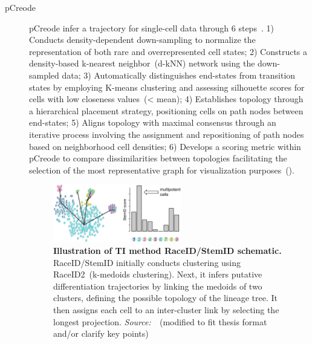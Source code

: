 \begin{description}
  \item[pCreode]

  pCreode infer a trajectory for single-cell data through 6 steps~\citep{herring2018pCreode}. 1) Conducts density-dependent down-sampling to normalize the representation of both rare and overrepresented cell states; 2) Constructs a density-based k-nearest neighbor~(d-kNN) network using the down-sampled data; 3) Automatically distinguishes end-states from transition states by employing K-means clustering and assessing silhouette scores for cells with low closeness values~(< mean); 4) Establishes topology through a hierarchical placement strategy, positioning cells on path nodes between end-states; 5) Aligns topology with maximal consensus through an iterative process involving the assignment and repositioning of path nodes based on neighborhood cell densities; 6) Develops a scoring metric within pCreode to compare dissimilarities between topologies facilitating the selection of the most representative graph for visualization purposes~().

  \begin{figure}[h!]
  	\centering
  	\includegraphics[width=0.55\textwidth]{TI_Alg_StemID/fig}
  	\vspace{0.1cm}
  	\caption[Illustration of TI method RaceID/StemID schematic.]{\textbf{Illustration of TI method RaceID/StemID schematic.}
  	RaceID/StemID initially conducts clustering using RaceID2~(k-medoids clustering). Next, it infers putative differentiation trajectories by linking the medoids of two clusters, defining the possible topology of the lineage tree. It then assigns each cell to an inter-cluster link by selecting the longest projection. \emph{Source:~\cite{albergante2020ElPiGraph}}~(modified to fit thesis format and/or clarify key points)
  	}
  	\label{fig:TI_Alg_StemID}
  \end{figure}


\end{description}

